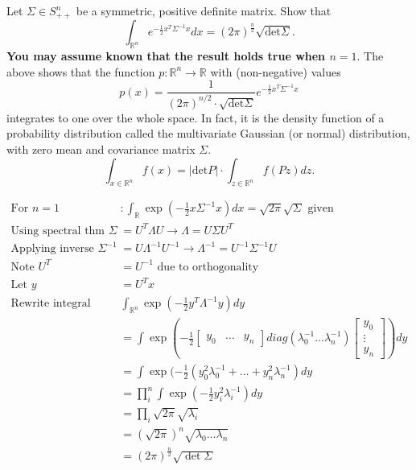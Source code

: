 \documentclass[11pt]{article}
\begin{document}
Let $\Sigma \in S^n_{++}$ be a symmetric, positive definite matrix. Show that
$$
\int_{\mathbb{R}^n} e^{-\frac{1}{2}x^T \Sigma^{-1} x} dx
= (2 \pi)^{\frac{n}{2}} \sqrt{\text{det} \Sigma}.
$$
\textbf{You may assume known that the result holds true when $n = 1$}. The above shows that the function $p : \mathbb{R}^n \rightarrow \mathbb{R}$ with (non-negative) values
$$
p(x) = \frac{1}{(2\pi)^{n/2} \cdot \sqrt{\text{det} \Sigma}} e^{-\frac{1}{2} x^T \Sigma^{-1} x}
$$
integrates to one over the whole space. In fact, it is the density function of a probability distribution called the multivariate Gaussian (or normal) distribution, with zero mean and covariance matrix $\Sigma$.
$$
\int_{x \in \mathbb{R}^n} f(x)
=
|\text{det} P| \cdot \int_{z \in \mathbb{R}^n} f(Pz) dz.
$$

\begin{solution}
\begin{align*}
    \text{For } n = 1&: \int_{\mathbb{R}} \exp(-\frac{1}{2} x \Sigma^{-1} x) dx = \sqrt{2 \pi} \sqrt{\Sigma} \text{ given} \\
    \text{Using spectral thm } \Sigma &= U^T \Lambda U \rightarrow \Lambda = U \Sigma U^T \\
    \text{Applying inverse } \Sigma^{-1} &= U \Lambda^{-1} U^{-1} \rightarrow \Lambda^{-1} = U^{-1} \Sigma^{-1} U \\
    \text{Note } U^T &= U^{-1} \text{ due to orthogonality} \\
    \text{Let } y &= U^T x \\
    \text{Rewrite integral } &\int_{\mathbb{R}^n} \exp(-\frac{1}{2} y^T \Lambda^{-1} y) dy \\
    &= \int \exp(-\frac{1}{2} \begin{bmatrix} y_0 & \dots & y_n\end{bmatrix} diag(\lambda_0^{-1} \dots \lambda_n^{-1}) \begin{bmatrix} y_0 \\ \vdots \\ y_n \end{bmatrix}) dy \\
    &= \int \exp(-\frac{1}{2} (y_0^2 \lambda_0^{-1} + \dots + y_n^2 \lambda_n^{-1}) dy \\
    &= \prod_i^{n} \int \exp(-\frac{1}{2} y_i^2 \lambda_i^{-1}) dy \\
    &= \prod_i \sqrt{2 \pi} \sqrt{\lambda_i} \\
    &= (\sqrt{2 \pi})^n \sqrt{\lambda_0 \dots \lambda_n} \\
    &= (2 \pi)^{\frac{n}{2}} \sqrt{\det \Sigma}
\end{align*}

\end{solution}
\end{document}
